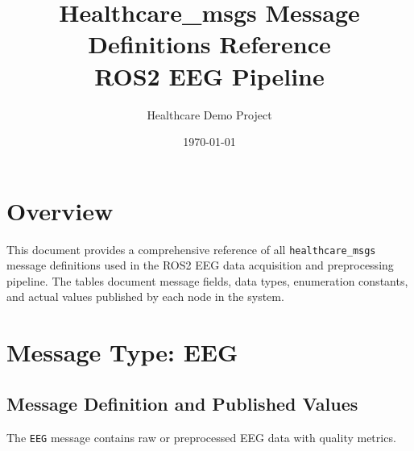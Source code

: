 \documentclass[11pt,a4paper]{article}
\title{Healthcare\_msgs Message Definitions Reference\\ROS2 EEG Pipeline}
\author{Healthcare Demo Project}
\date{\today}
\begin{document}
\maketitle

\section{Overview}
This document provides a comprehensive reference of all \texttt{healthcare\_msgs} message definitions used in the ROS2 EEG data acquisition and preprocessing pipeline. The tables document message fields, data types, enumeration constants, and actual values published by each node in the system.

\section{Message Type: EEG}
\subsection{Message Definition and Published Values}
The \texttt{EEG} message contains raw or preprocessed EEG data with quality metrics.
\end{document}
